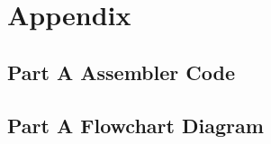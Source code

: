 \documentclass[letterpaper]{article}
\begin{document}
\newpage
\section{Appendix}
  \subsection{Part A Assembler Code}
    
\newpage
  \subsection{Part A Flowchart Diagram}
    \vspace{2cm}
    \noindent{}
\newpage
\end{document}

